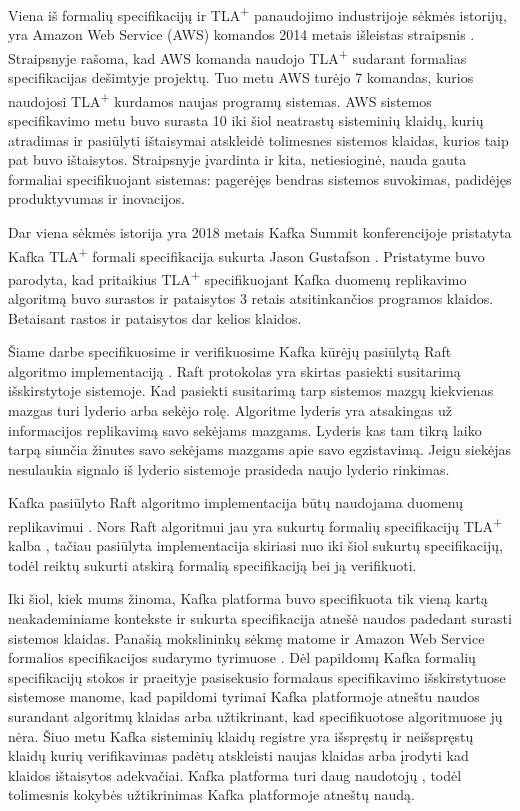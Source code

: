 \documentclass{VUMIFPSmagistrinis}
\begin{document}
		Viena iš formalių specifikacijų ir TLA\textsuperscript{+} panaudojimo industrijoje sėkmės istorijų, yra Amazon Web Service (AWS) komandos 2014 metais išleistas straipsnis \cite{newcombe2014use}.
		Straipsnyje rašoma,  kad AWS komanda naudojo TLA\textsuperscript{+} sudarant formalias specifikacijas dešimtyje projektų. Tuo metu AWS turėjo 7 komandas, kurios naudojosi TLA\textsuperscript{+} kurdamos naujas programų sistemas.
		AWS sistemos specifikavimo metu buvo surasta 10 iki šiol neatrastų sisteminių klaidų, kurių atradimas ir pasiūlyti ištaisymai atskleidė tolimesnes sistemos klaidas, kurios taip pat buvo ištaisytos.
		Straipsnyje įvardinta ir kita, netiesioginė, nauda gauta formaliai specifikuojant sistemas: pagerėjęs bendras sistemos suvokimas, padidėjęs produktyvumas ir inovacijos.
		

		Dar viena sėkmės istorija yra 2018 metais Kafka Summit konferencijoje pristatyta Kafka TLA\textsuperscript{+} formali specifikacija sukurta Jason Gustafson \cite{kfkTla}.
		Pristatyme buvo parodyta, kad pritaikius TLA\textsuperscript{+} specifikuojant Kafka duomenų replikavimo algoritmą buvo surastos ir pataisytos 3 retais atsitinkančios programos klaidos.
		Betaisant rastos ir pataisytos dar kelios klaidos.


		Šiame darbe specifikuosime ir verifikuosime Kafka kūrėjų pasiūlytą Raft algoritmo \cite{10.1145/2723872.2723876} implementaciją \cite{raftimpl}.
		Raft protokolas yra skirtas pasiekti susitarimą išskirstytoje sistemoje.
		Kad pasiekti susitarimą tarp sistemos mazgų kiekvienas mazgas turi lyderio arba sekėjo rolę.
		Algoritme lyderis yra atsakingas už informacijos replikavimą savo sekėjams mazgams.
		Lyderis kas tam tikrą laiko tarpą siunčia žinutes savo sekėjams mazgams apie savo egzistavimą.
		Jeigu siekėjas nesulaukia signalo iš lyderio sistemoje prasideda naujo lyderio rinkimas.
		
		
		Kafka pasiūlyto Raft algoritmo implementacija būtų naudojama duomenų replikavimui \cite{raftimpl}.
		Nors Raft algoritmui jau yra sukurtų formalių specifikacijų TLA\textsuperscript{+} kalba \cite{rafttla}, tačiau pasiūlyta implementacija skiriasi nuo iki šiol sukurtų specifikacijų, todėl reiktų sukurti atskirą formalią specifikaciją bei ją verifikuoti.


		Iki šiol, kiek mums žinoma, Kafka platforma buvo specifikuota tik vieną kartą \cite{kfkTla} neakademiniame kontekste ir sukurta specifikacija atnešė naudos padedant surasti sistemos klaidas.
		Panašią mokslininkų sėkmę matome ir Amazon Web Service formalios specifikacijos sudarymo tyrimuose \cite{newcombe2014use}.
		Dėl papildomų Kafka formalių specifikacijų stokos ir praeityje pasisekusio formalaus specifikavimo išskirstytuose sistemose manome, kad papildomi tyrimai Kafka platformoje atneštu naudos surandant algoritmų klaidas arba užtikrinant, kad specifikuotose algoritmuose jų nėra.
		Šiuo metu Kafka sisteminių klaidų registre \cite{kfkissue} yra išspręstų ir neišspręstų  klaidų kurių verifikavimas padėtų atskleisti naujas klaidas arba įrodyti kad klaidos ištaisytos adekvačiai.
		Kafka platforma turi daug naudotojų \cite{kfk}, todėl tolimesnis kokybės užtikrinimas Kafka platformoje atneštų naudą.
\end{document}
